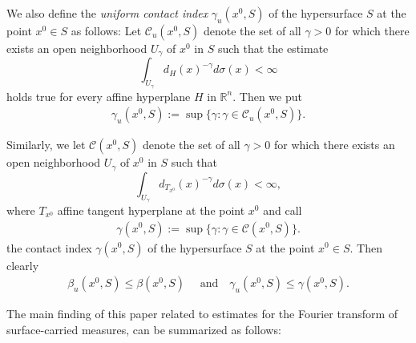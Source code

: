 \documentclass[a4paper, 11pt]{article}
\theoremstyle{plain}
\theoremstyle{definition}
\theoremstyle{lemma}
\theoremstyle{Remark}
\theoremstyle{proposition}
\theoremstyle{corollary}
\theoremstyle{example}
\theoremstyle{assumption}
\begin{document}
We also define the \emph{uniform contact index}
$\gamma_u(x^0, S)$ of the hypersurface $S$ at the
point $x^0\in S$ as follows: Let $\mathcal{C}_u(x^0, S)$ denote the set of all
$\gamma>$0 for which there exists an
open neighborhood $U_\gamma$
 of $x^0$ in $S$ such that the estimate
\begin{equation*}
\int_{U_\gamma}d_H(x)^{-\gamma} d\sigma(x)<\infty
\end{equation*}
holds true for every affine hyperplane $H$ in $\mathbb{R}^n$. Then we put
\begin{eqnarray*}
\gamma_u(x^0, S):=\sup\{\gamma: \gamma\in  \mathcal{C}_u(x^0, S) \}.
\end{eqnarray*}

Similarly, we let $\mathcal{C}(x^0, S)$ denote the set of all
$\gamma>0$ for which there exists an open neighborhood
$U_\gamma$ of $x^0$ in $S$ such that
\begin{equation*}
\int_{U_\gamma}d_{T_{x^0}}(x)^{-\gamma} d\sigma(x)<\infty,
\end{equation*}
where $T_{x^0}$ affine tangent hyperplane at the point $x^0$
and call
\begin{eqnarray*}
\gamma(x^0, S) :=\sup\{
\gamma: \gamma\in  \mathcal{C}(x^0, S)\}.
\end{eqnarray*}
the contact index
$\gamma(x^0, S)$ of the hypersurface $S$ at the point $x^0\in S$. Then clearly
\begin{eqnarray*}
\beta_u(x^0, S)\le \beta(x^0, S)\quad \mbox{ and}\quad
\gamma_u(x^0, S)\le \gamma(x^0, S).
\end{eqnarray*}

The main finding of this paper related to estimates for the Fourier transform of surface-carried measures, can be summarized as follows:
\end{document}
